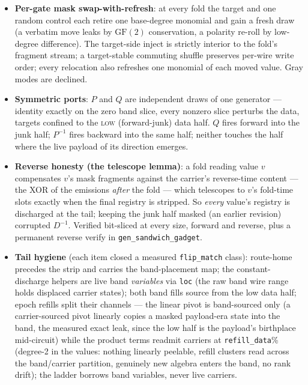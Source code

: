 \documentclass[11pt]{article}
\begin{document}
\begin{itemize}
\item \textbf{Per-gate mask swap-with-refresh}: at every fold the target
and one random control each retire one base-degree monomial and gain a
fresh draw (a verbatim move leaks by $\mathrm{GF}(2)$ conservation, a
polarity re-roll by low-degree difference). The target-side inject is
strictly interior to the fold's fragment stream; a target-stable
commuting shuffle preserves per-wire write order; every relocation also
refreshes one monomial of each moved value. Gray modes are declined.
\item \textbf{Symmetric ports}: $P$ and $Q$ are independent draws of one
generator --- identity exactly on the zero band slice, every nonzero
slice perturbs the data, targets confined to the \textsc{low}
(forward-junk) data half. $Q$ fires forward into the junk half; $P^{-1}$
fires backward into the same half; neither touches the half where the
live payload of its direction emerges.
\item \textbf{Reverse honesty (the telescope lemma)}: a fold reading
value $v$ compensates $v$'s mask fragments against the carrier's
reverse-time content --- the XOR of the emissions \emph{after} the fold
--- which telescopes to $v$'s fold-time slots exactly when the final
registry is stripped. So \emph{every} value's registry is discharged at
the tail; keeping the junk half masked (an earlier revision) corrupted
$D^{-1}$. Verified bit-sliced at every size, forward and reverse, plus a
permanent reverse verify in \texttt{gen\_sandwich\_gadget}.
\item \textbf{Tail hygiene} (each item closed a measured
\texttt{flip\_match} class): route-home precedes the strip and carries
the band-placement map; the constant-discharge helpers are live band
\emph{variables} via \texttt{loc} (the raw band wire range holds
displaced carrier states); both band fills source from the low data
half; epoch refills split their channels --- the linear pivot is
band-sourced only (a carrier-sourced pivot linearly copies a masked
payload-era state into the band, the measured exact leak, since the low
half is the payload's birthplace mid-circuit) while the product terms
readmit carriers at \texttt{refill\_data}\% (degree-2 in the values:
nothing linearly peelable, refill clusters read across the band/carrier
partition, genuinely new algebra enters the band, no rank drift); the
ladder borrows band variables, never live carriers.
\end{itemize}
\end{document}
